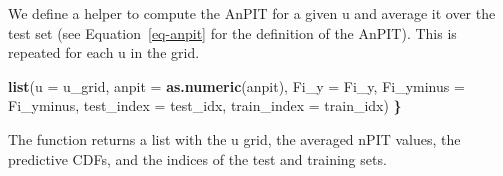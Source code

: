 \documentclass[
  letterpaper,
]{krantz}
\newenvironment{Shaded}{\begin{snugshade}}{\end{snugshade}}
\newcommand{\AttributeTok}[1]{\textcolor[rgb]{0.13,0.29,0.53}{#1}}
\newcommand{\ConstantTok}[1]{\textcolor[rgb]{0.56,0.35,0.01}{#1}}
\newcommand{\ControlFlowTok}[1]{\textcolor[rgb]{0.13,0.29,0.53}{\textbf{#1}}}
\newcommand{\DecValTok}[1]{\textcolor[rgb]{0.00,0.00,0.81}{#1}}
\newcommand{\ErrorTok}[1]{\textcolor[rgb]{0.64,0.00,0.00}{\textbf{#1}}}
\newcommand{\FloatTok}[1]{\textcolor[rgb]{0.00,0.00,0.81}{#1}}
\newcommand{\FunctionTok}[1]{\textcolor[rgb]{0.13,0.29,0.53}{\textbf{#1}}}
\newcommand{\NormalTok}[1]{#1}
\newcommand{\OtherTok}[1]{\textcolor[rgb]{0.56,0.35,0.01}{#1}}
\newcommand{\SpecialCharTok}[1]{\textcolor[rgb]{0.81,0.36,0.00}{\textbf{#1}}}
\newcommand{\StringTok}[1]{\textcolor[rgb]{0.31,0.60,0.02}{#1}}
\begin{document}
We define a helper to compute the AnPIT for a given u and average it
over the test set (see Equation~\ref{eq-anpit} for the definition of the
AnPIT). This is repeated for each u in the grid.

\begin{Shaded}
\begin{Highlighting}[]
  \FunctionTok{list}\NormalTok{(}\AttributeTok{u =}\NormalTok{ u\_grid,}
       \AttributeTok{anpit =} \FunctionTok{as.numeric}\NormalTok{(anpit),}
       \AttributeTok{Fi\_y =}\NormalTok{ Fi\_y,}
       \AttributeTok{Fi\_yminus =}\NormalTok{ Fi\_yminus,}
       \AttributeTok{test\_index =}\NormalTok{ test\_idx,}
       \AttributeTok{train\_index =}\NormalTok{ train\_idx)}
\ErrorTok{\}}
\end{Highlighting}
\end{Shaded}

The function returns a list with the u grid, the averaged nPIT values,
the predictive CDFs, and the indices of the test and training sets.

\begin{Shaded}
\end{Shaded}
\end{document}
